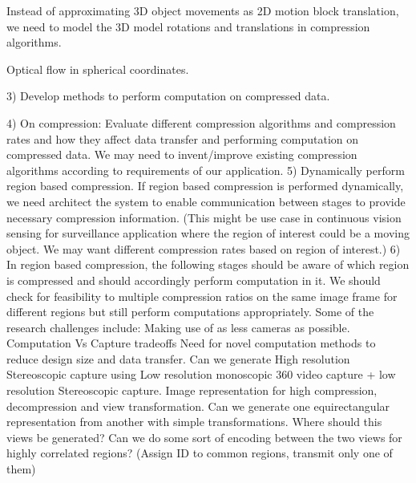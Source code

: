 

Instead of approximating 3D object movements as 2D motion block translation, we need to model the 3D model rotations and translations in compression algorithms.

Optical flow in spherical coordinates.
	
3) 
Develop methods to perform computation on compressed data.


4)
On compression: 
Evaluate different compression algorithms and compression rates and how they affect data transfer and performing computation on compressed data. We may need to invent/improve existing compression algorithms according to requirements of our application.
5) 
Dynamically perform region based compression. If region based compression is performed dynamically, we need architect the system to enable communication between stages to provide necessary compression information. (This might be use case in continuous vision sensing for surveillance application where the region of interest could be a moving object. We may want different compression rates based on region of interest.) 
6)
In region based compression, the following stages should be aware of which region is compressed and should accordingly​ perform computation in it. We should check for feasibility  to multiple compression ratios on the same image frame for different regions but still perform computations appropriately. 
Some of the research challenges include:
Making use of as less cameras as possible.
Computation Vs Capture tradeoffs
Need for novel computation methods to reduce design size and data transfer.
Can we generate High resolution Stereoscopic capture using Low resolution monoscopic 360 video capture + low resolution Stereoscopic capture.
Image representation for high compression, decompression and view transformation.
Can we generate one equirectangular representation from another with simple transformations. 
Where should this views be generated?
Can we do some sort of encoding between the two views for highly correlated regions? (Assign ID to common regions, transmit only one of them)

